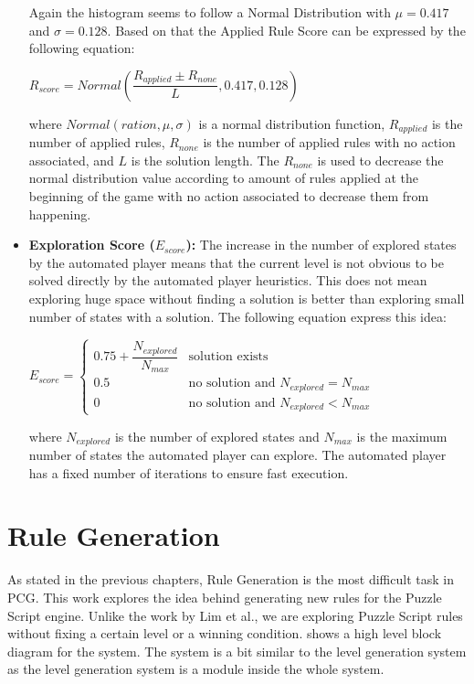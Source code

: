 \begin{itemize}
	
	Again the histogram seems to follow a Normal Distribution with $\mu = 0.417$ and $\sigma = 0.128$. Based on that the Applied Rule Score can be expressed by the following equation:
	\begin{center}$R_{score} = Normal(\dfrac{R_{applied} \pm R_{none}}{L}, 0.417, 0.128)$\end{center}
	where $Normal(ration, \mu, \sigma)$ is a normal distribution function, $R_{applied}$ is the number of applied rules, $R_{none}$ is the number of applied rules with no action associated, and $L$ is the solution length. The $R_{none}$ is used to decrease the normal distribution value according to amount of rules applied at the beginning of the game with no action associated to decrease them from happening.
	
	\item \textbf{Exploration Score ($E_{score}$):} The increase in the number of explored states by the automated player means that the current level is not obvious to be solved directly by the automated player heuristics. This does not mean exploring huge space without finding a solution is better than exploring small number of states with a solution. The following equation express this idea:
	\begin{center}
	$E_{score}= \begin{cases}
	               0.75 + \dfrac{N_{explored}}{N_{max}} & \text{solution exists}\\
	               0.5 & \text{no solution and }N_{explored} = N_{max}\\
	               0 & \text{no solution and }N_{explored} < N_{max}
	           \end{cases}$
	\end{center}
	where $N_{explored}$ is the number of explored states and $N_{max}$ is the maximum number of states the automated player can explore. The automated player has a fixed number of iterations to ensure fast execution.
\end{itemize}

\section{Rule Generation}
As stated in the previous chapters, Rule Generation is the most difficult task in PCG. This work explores the idea behind generating new rules for the Puzzle Script engine. Unlike the work by Lim et al.\cite{puzzleScriptGeneration}, we are exploring Puzzle Script rules without fixing a certain level or a winning condition.  shows a high level block diagram for the system. The system is a bit similar to the level generation system as the level generation system is a module inside the whole system.

